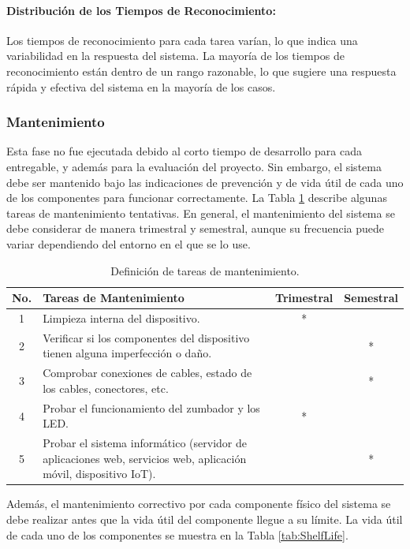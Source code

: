 \documentclass[a4paper,fleqn]{cas-sc}
\begin{document}
					\paragraph{Distribución de los Tiempos de Reconocimiento:}
						Los tiempos de reconocimiento para cada tarea varían, lo que indica una variabilidad en la respuesta del sistema. La mayoría de los tiempos de reconocimiento están dentro de un rango razonable, lo que sugiere una respuesta rápida y efectiva del sistema en la mayoría de los casos.
					
			\subsubsection{Mantenimiento}
				Esta fase no fue ejecutada debido al corto tiempo de desarrollo para cada entregable, y además para la evaluación del proyecto. Sin embargo, el sistema debe ser mantenido bajo las indicaciones de prevención y de vida útil de cada uno de los componentes para funcionar correctamente. La Tabla \ref{tab:maintenance-tasks} describe algunas tareas de mantenimiento tentativas. En general, el mantenimiento del sistema se debe considerar de manera trimestral y semestral, aunque su frecuencia puede variar dependiendo del entorno en el que se lo use.
			
				\begin{table}[h]
					\centering
					\caption{Definición de tareas de mantenimiento.}
					\label{tab:maintenance-tasks}
					\begin{tabularx}{\textwidth}{cXcc}
						\toprule
						\textbf{No.} & \textbf{Tareas de Mantenimiento} & \textbf{Trimestral} & \textbf{Semestral} \\
						\midrule
						1 & Limpieza interna del dispositivo. & * & \\
						2 & Verificar si los componentes del dispositivo tienen alguna imperfección o daño. & & * \\
						3 & Comprobar conexiones de cables, estado de los cables, conectores, etc. & & * \\
						4 & Probar el funcionamiento del zumbador y los LED. & * & \\
						5 & Probar el sistema informático (servidor de aplicaciones web, servicios web, aplicación móvil, dispositivo IoT). & & * \\
						\bottomrule
					\end{tabularx}
				\end{table}
				Además, el mantenimiento correctivo por cada componente físico del sistema se debe realizar antes que la vida útil del componente llegue a su límite. La vida útil de cada uno de los componentes se muestra en la Tabla \ref{tab:ShelfLife}.
				
\end{document}

